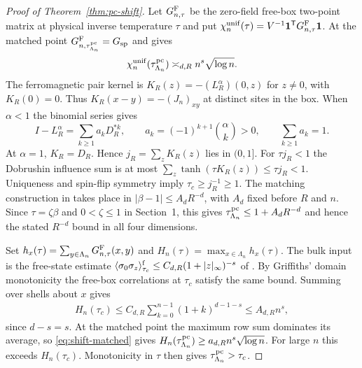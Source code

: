 \documentclass[11pt]{article}
\numberwithin{equation}{section}
\newcommand{\one}{\mathbf 1}
\begin{document}
\begin{proof}[Proof of Theorem~\ref{thm:pc-shift}]
Let $G_{n,\tau}^{\rm F}$ be the zero-field free-box two-point matrix at
physical inverse temperature $\tau$ and put
$\chi_n^{\rm unif}(\tau)=V^{-1}\one^{\mathsf T}G_{n,\tau}^{\rm F}\one$.
At the matched point $G_{n,\tau_{\Lambda_n}^{\rm pc}}^{\rm F}=G_{\rm sp}$ and
\cite[Theorem~1.1]{base} gives
\begin{equation}\label{eq:shift-matched}
 \chi_n^{\rm unif}(\tau_{\Lambda_n}^{\rm pc})\asymp_{d,R}n^s\sqrt{\log n}.
\end{equation}
The ferromagnetic pair kernel is
$K_R(z)=-(L_R^\alpha)(0,z)$ for $z\ne0$, with $K_R(0)=0$.
Thus $K_R(x-y)=-(J_n)_{xy}$ at distinct sites in the box. When
$\alpha<1$ the binomial series gives
\begin{equation}\label{eq:shift-walk}
 I-L_R^\alpha=\sum_{k\ge1}a_kD_R^{*k},\qquad
 a_k=(-1)^{k+1}\binom{\alpha}{k}>0,\qquad \sum_{k\ge1}a_k=1.
\end{equation}
At $\alpha=1$, $K_R=D_R$. Hence $j_R=\sum_zK_R(z)$ lies in $(0,1]$.
For $\tau j_R<1$ the Dobrushin influence sum is at most
$\sum_z\tanh(\tau K_R(z))\le\tau j_R<1$. Uniqueness and spin-flip
symmetry imply $\tau_c\ge j_R^{-1}\ge1$. The matching construction in
\cite[Corollaries~6.3 and~7.13, Proposition~7.14]{base} takes place in
$|\beta-1|\le A_dR^{-d}$, with $A_d$ fixed before $R$ and $n$.
Since $\tau=\zeta\beta$ and $0<\zeta\le1$ in Section~1, this gives
$\tau_{\Lambda_n}^{\rm pc}\le1+A_dR^{-d}$ and hence the stated
$R^{-d}$ bound in all four dimensions.

Set $h_x(\tau)=\sum_{y\in\Lambda_n}G_{n,\tau}^{\rm F}(x,y)$ and
$H_n(\tau)=\max_{x\in\Lambda_n}h_x(\tau)$. The bulk input is the
free-state estimate
$\langle\sigma_0\sigma_z\rangle_{\tau_c}^{\rm f}
\le C_{d,R}(1+|z|_\infty)^{-s}$ of \cite[Theorem~1]{park-bulk}.
By Griffiths' domain monotonicity the free-box correlations at $\tau_c$
satisfy the same bound. Summing over shells about $x$ gives
\begin{align}
 H_n(\tau_c)\le C_{d,R}\sum_{k=0}^{n-1}(1+k)^{d-1-s}\le A_{d,R}n^s,
\end{align}
since $d-s=s$. At the matched point the maximum row sum dominates its
average, so \eqref{eq:shift-matched} gives
$H_n(\tau_{\Lambda_n}^{\rm pc})\ge a_{d,R}n^s\sqrt{\log n}$.
For large $n$ this exceeds $H_n(\tau_c)$. Monotonicity in $\tau$
then gives $\tau_{\Lambda_n}^{\rm pc}>\tau_c$.


\end{proof}
\end{document}
